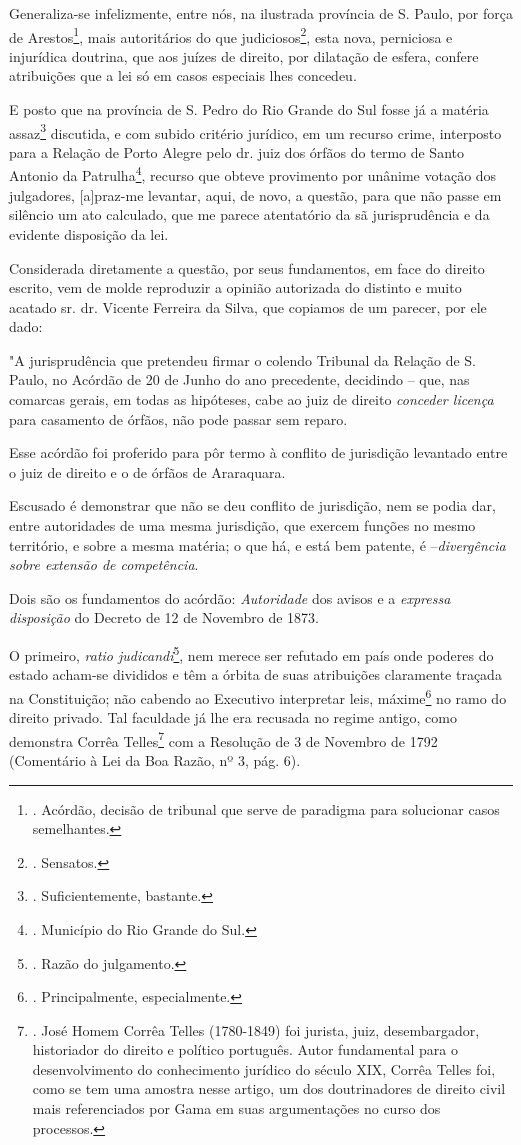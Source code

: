 Generaliza-se infelizmente, entre nós, na ilustrada província de S.
Paulo, por força de Arestos\footnote{. Acórdão, decisão de tribunal que
  serve de paradigma para solucionar casos semelhantes.}, mais
autoritários do que judiciosos\footnote{. Sensatos.}, esta nova,
perniciosa e injurídica doutrina, que aos juízes de direito, por
dilatação de esfera, confere atribuições que a lei só em casos especiais
lhes concedeu.

E posto que na província de S. Pedro do Rio Grande do Sul fosse já a
matéria assaz\footnote{. Suficientemente, bastante.} discutida, e com
subido critério jurídico, em um recurso crime, interposto para a Relação
de Porto Alegre pelo dr. juiz dos órfãos do termo de Santo Antonio da
Patrulha\footnote{. Município do Rio Grande do Sul.}, recurso que obteve
provimento por unânime votação dos julgadores, {[}a{]}praz-me levantar,
aqui, de novo, a questão, para que não passe em silêncio um ato
calculado, que me parece atentatório da sã jurisprudência e da evidente
disposição da lei.

Considerada diretamente a questão, por seus fundamentos, em face do
direito escrito, vem de molde reproduzir a opinião autorizada do
distinto e muito acatado sr. dr. Vicente Ferreira da Silva, que copiamos
de um parecer, por ele dado:

"A jurisprudência que pretendeu firmar o colendo Tribunal da Relação de
S. Paulo, no Acórdão de 20 de Junho do ano precedente, decidindo -- que,
nas comarcas gerais, em todas as hipóteses, cabe ao juiz de direito
\emph{conceder licença} para casamento de órfãos, não pode passar sem
reparo.

Esse acórdão foi proferido para pôr termo à conflito de jurisdição
levantado entre o juiz de direito e o de órfãos de Araraquara.

Escusado é demonstrar que não se deu conflito de jurisdição, nem se
podia dar, entre autoridades de uma mesma jurisdição, que exercem
funções no mesmo território, e sobre a mesma matéria; o que há, e está
bem patente, é --\emph{divergência sobre extensão de competência}.

Dois são os fundamentos do acórdão: \emph{Autoridade} dos avisos e a
\emph{expressa disposição} do Decreto de 12 de Novembro de 1873.

O primeiro, \emph{ratio judicandi}\footnote{. Razão do julgamento.}, nem
merece ser refutado em país onde poderes do estado acham-se divididos e
têm a órbita de suas atribuições claramente traçada na Constituição; não
cabendo ao Executivo interpretar leis, máxime\footnote{. Principalmente,
  especialmente.} no ramo do direito privado. Tal faculdade já lhe era
recusada no regime antigo, como demonstra Corrêa Telles\footnote{. José
  Homem Corrêa Telles (1780-1849) foi jurista, juiz, desembargador,
  historiador do direito e político português. Autor fundamental para o
  desenvolvimento do conhecimento jurídico do século XIX, Corrêa Telles
  foi, como se tem uma amostra nesse artigo, um dos doutrinadores de
  direito civil mais referenciados por Gama em suas argumentações no
  curso dos processos.} com a Resolução de 3 de Novembro de 1792
(Comentário à Lei da Boa Razão, nº 3, pág. 6).

